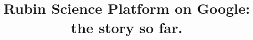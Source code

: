 \documentclass[11pt,twoside]{article}
\begin{document}
\title{Rubin Science Platform on Google: the story so far.}


\end{document}
